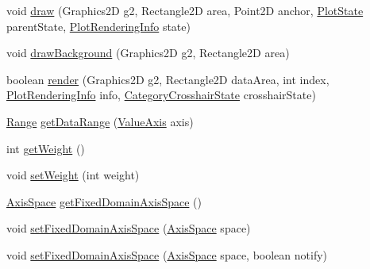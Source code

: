\begin{DoxyCompactItemize}
\item 
void \mbox{\hyperlink{classorg_1_1jfree_1_1chart_1_1plot_1_1_category_plot_ac32fc9b28844db99ced138bd570596c3}{draw}} (Graphics2D g2, Rectangle2D area, Point2D anchor, \mbox{\hyperlink{classorg_1_1jfree_1_1chart_1_1plot_1_1_plot_state}{Plot\+State}} parent\+State, \mbox{\hyperlink{classorg_1_1jfree_1_1chart_1_1plot_1_1_plot_rendering_info}{Plot\+Rendering\+Info}} state)
\item 
void \mbox{\hyperlink{classorg_1_1jfree_1_1chart_1_1plot_1_1_category_plot_a20163a552c26dc8dc77c40775eedd167}{draw\+Background}} (Graphics2D g2, Rectangle2D area)
\item 
boolean \mbox{\hyperlink{classorg_1_1jfree_1_1chart_1_1plot_1_1_category_plot_aae0a49669b88b399ef13fa270d15cf74}{render}} (Graphics2D g2, Rectangle2D data\+Area, int index, \mbox{\hyperlink{classorg_1_1jfree_1_1chart_1_1plot_1_1_plot_rendering_info}{Plot\+Rendering\+Info}} info, \mbox{\hyperlink{classorg_1_1jfree_1_1chart_1_1plot_1_1_category_crosshair_state}{Category\+Crosshair\+State}} crosshair\+State)
\item 
\mbox{\hyperlink{classorg_1_1jfree_1_1data_1_1_range}{Range}} \mbox{\hyperlink{classorg_1_1jfree_1_1chart_1_1plot_1_1_category_plot_a24ad189c085ce4d54b3c9bfbe18b9460}{get\+Data\+Range}} (\mbox{\hyperlink{classorg_1_1jfree_1_1chart_1_1axis_1_1_value_axis}{Value\+Axis}} axis)
\item 
int \mbox{\hyperlink{classorg_1_1jfree_1_1chart_1_1plot_1_1_category_plot_ad53da6d191b15b1c86d02b9be5de2adf}{get\+Weight}} ()
\item 
void \mbox{\hyperlink{classorg_1_1jfree_1_1chart_1_1plot_1_1_category_plot_a1a21197688cb44c6e9e477735f2dddc2}{set\+Weight}} (int weight)
\item 
\mbox{\hyperlink{classorg_1_1jfree_1_1chart_1_1axis_1_1_axis_space}{Axis\+Space}} \mbox{\hyperlink{classorg_1_1jfree_1_1chart_1_1plot_1_1_category_plot_aae0ace36bbd4bc7545ff2d8fe2b7cc82}{get\+Fixed\+Domain\+Axis\+Space}} ()
\item 
void \mbox{\hyperlink{classorg_1_1jfree_1_1chart_1_1plot_1_1_category_plot_aefb6291a621dc2a80b97ae40ae020cf9}{set\+Fixed\+Domain\+Axis\+Space}} (\mbox{\hyperlink{classorg_1_1jfree_1_1chart_1_1axis_1_1_axis_space}{Axis\+Space}} space)
\item 
void \mbox{\hyperlink{classorg_1_1jfree_1_1chart_1_1plot_1_1_category_plot_abd178c513e4b2f8feedf0a9d0e8c7455}{set\+Fixed\+Domain\+Axis\+Space}} (\mbox{\hyperlink{classorg_1_1jfree_1_1chart_1_1axis_1_1_axis_space}{Axis\+Space}} space, boolean notify)

\end{DoxyCompactItemize}
